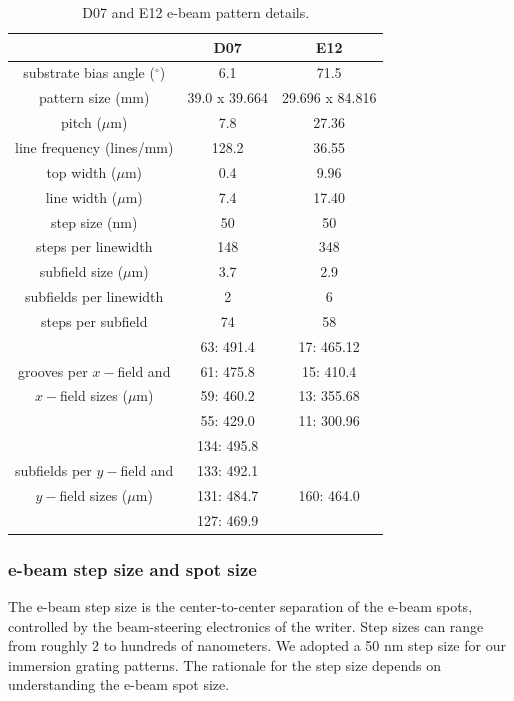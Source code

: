 \documentclass[]{spie}  %
\begin{document}
\begin{table}
	\begin{center}
	\caption{D07 and E12 e-beam pattern details. \label{tab:D07andE12}}
	\begin{tabular}{ccc}
	\toprule
	   &D07 & E12  \\
	\midrule
	substrate bias angle ($^\circ$) & 6.1 & 71.5 \\
	pattern size (mm) & 39.0 x 39.664 & 29.696 x 84.816 \\
	pitch ($\mu$m) & 7.8 & 27.36 \\
	line frequency (lines/mm) & 128.2 & 36.55 \\
	top width ($\mu$m) & 0.4 & 9.96 \\
	line width ($\mu$m) & 7.4 & 17.40 \\
	step size (nm) & 50 & 50 \\
	steps per linewidth & 148 & 348 \\
	subfield size ($\mu$m) & 3.7 & 2.9 \\
	subfields per linewidth & 2 & 6 \\
	steps per subfield & 74 & 58 \\
	\cline{1-1}
	 			      & 63: 491.4  & 17: 465.12 \\
	grooves per $x-$field and & 61: 475.8 & 15: 410.4 \\
	$x-$field sizes ($\mu$m) & 59: 460.2 & 13: 355.68 \\
	 				        & 55: 429.0 & 11: 300.96 \\
	\cline{1-1}					        
	 			      & 134: 495.8  &   \\
	subfields per $y-$field and & 133: 492.1 &   \\
	$y-$field sizes ($\mu$m) & 131: 484.7 & 160: 464.0 \\
	 				        & 127: 469.9 &   \\	
	\cline{1-1}
	\bottomrule
	\end{tabular}
	\end{center}
\end{table}	


\subsubsection{e-beam step size and spot size}
The e-beam step size is the center-to-center separation of the e-beam spots, controlled by the beam-steering electronics of the writer.  Step sizes can range from roughly 2 to hundreds of nanometers.  We adopted a 50 nm step size for our immersion grating patterns.  The rationale for the step size depends on understanding the e-beam spot size.  
\end{document}
